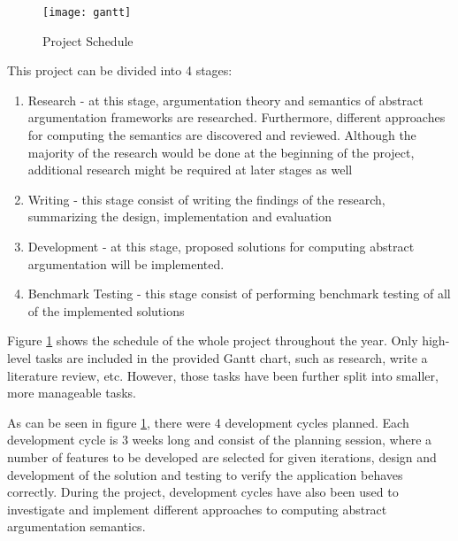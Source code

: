 \begin{landscape}
	\centering
	\begin{figure}[]
		\texttt{[image: gantt]}
		\caption{Project Schedule}
		\label{fig:projectSchedule}
	\end{figure}
\end{landscape}

This project can be divided into 4 stages:
\begin{enumerate}
	\item Research - at this stage, argumentation theory and semantics of abstract argumentation frameworks are researched. Furthermore, different approaches for computing the semantics are discovered and reviewed. Although the majority of the research would be done at the beginning of the project, additional research might be required at later stages as well
	\item Writing - this stage consist of writing the findings of the research, summarizing the design, implementation and evaluation
	\item Development - at this stage, proposed solutions for computing abstract argumentation will be implemented. 
	\item Benchmark Testing - this stage consist of performing benchmark testing of all of the implemented solutions
\end{enumerate}

Figure \ref{fig:projectSchedule} shows the schedule of the whole project throughout the year. Only high-level tasks are included in the provided Gantt chart, such as research, write a literature review, etc. However, those tasks have been further split into smaller, more manageable tasks.  


As can be seen in figure \ref{fig:projectSchedule}, there were 4 development cycles planned. Each development cycle is 3 weeks long and consist of the planning session, where a number of features to be developed are selected for given iterations, design and development of the solution and testing to verify the application behaves correctly. During the project, development cycles have also been used to investigate and implement different approaches to computing abstract argumentation semantics.
